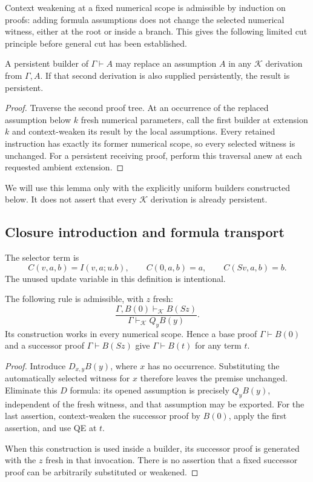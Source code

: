 Context weakening at a fixed numerical scope is admissible by induction on
proofs: adding formula assumptions does not change the selected numerical
witness, either at the root or inside a branch. This gives the following
limited cut principle before general cut has been established.

\begin{lemma}
\label{lem:persistent-cut}
A persistent builder of $\Gamma\vdash A$ may replace an assumption $A$
in any $\mathcal K$ derivation from $\Gamma,A$. If that second derivation
is also supplied persistently, the result is persistent.
\end{lemma}

\begin{proof}
Traverse the second proof tree. At an occurrence of the replaced
assumption below $k$ fresh numerical parameters, call the first builder
at extension $k$ and context-weaken its result by the local assumptions.
Every retained instruction has exactly its former numerical scope, so
every selected witness is unchanged. For a persistent receiving proof,
perform this traversal anew at each requested ambient extension.
\end{proof}

We will use this lemma only with the explicitly uniform builders
constructed below. It does not assert that every $\mathcal K$ derivation
is already persistent.

\subsection{Closure introduction and formula transport}

The selector term is
\[
 C(v,a,b)=I(v,a;u.b),\qquad
 C(0,a,b)=a,\qquad C(Sv,a,b)=b.
\]
The unused update variable in this definition is intentional.

\begin{lemma}
\label{lem:newest-qcase}
The following rule is admissible, with $z$ fresh:
\[
 \frac{\Gamma,B(0)\vdash_{\mathcal K} B(Sz)}
      {\Gamma\vdash_{\mathcal K}Q_yB(y)}.
\]
Its construction works in every numerical scope. Hence a base proof
$\Gamma\vdash B(0)$ and a successor proof $\Gamma\vdash B(Sz)$ give
$\Gamma\vdash B(t)$ for any term $t$.
\end{lemma}

\begin{proof}
Introduce $D_{x,y}B(y)$, where $x$ has no occurrence. Substituting the
automatically selected witness for $x$ therefore leaves the premise
unchanged. Eliminate this $D$ formula: its opened assumption is precisely
$Q_yB(y)$, independent of the fresh witness, and that assumption may be
exported. For the last assertion, context-weaken the successor proof by
$B(0)$, apply the first assertion, and use QE at $t$.

When this construction is used inside a builder, its successor proof is
generated with the $z$ fresh in that invocation. There is no assertion
that a fixed successor proof can be arbitrarily substituted or weakened.
\end{proof}

